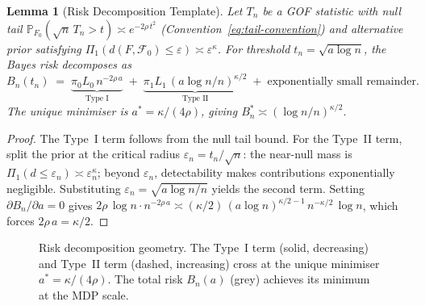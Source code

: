 \documentclass[11pt]{article}
\newcommand{\calF}{\mathcal{F}}
\newcommand{\rhotail}{\rho}  %
\newcommand{\1}{\mathbf{1}}
\newcommand{\PP}{\mathbb{P}}
\theoremstyle{plain}
\newtheorem{lemma}[theorem]{Lemma}
\theoremstyle{definition}
\theoremstyle{remark}
\begin{document}
\begin{lemma}[Risk Decomposition Template]\label{lem:risk-template}
Let $T_n$ be a GOF statistic with null tail $\PP_{F_0}(\sqrt{n}\,T_n > t) \asymp e^{-2\rhotail\, t^2}$ (Convention~\eqref{eq:tail-convention}) and alternative prior satisfying $\Pi_1(d(F,\calF_0)\le\varepsilon)\asymp\varepsilon^{\kappa}$.
For threshold $t_n = \sqrt{a\log n}$, the Bayes risk decomposes as
\[
B_n(t_n) \;=\; \underbrace{\pi_0 L_0\,n^{-2\rhotail\, a}}_{\text{Type I}} \;+\; \underbrace{\pi_1 L_1\,(a\log n/n)^{\kappa/2}}_{\text{Type II}} \;+\; \text{exponentially small remainder}.
\]
The unique minimiser is $a^{*} = \kappa/(4\rhotail)$, giving $B_n^{*} \asymp (\log n/n)^{\kappa/2}$.
\end{lemma}
\begin{proof}
The Type~I term follows from the null tail bound.
For the Type~II term, split the prior at the critical radius $\varepsilon_n = t_n/\sqrt{n}$: the near-null mass is $\Pi_1(d \le \varepsilon_n) \asymp \varepsilon_n^{\kappa}$; beyond $\varepsilon_n$, detectability makes contributions exponentially negligible.
Substituting $\varepsilon_n = \sqrt{a\log n / n}$ yields the second term.
Setting $\partial B_n/\partial a = 0$ gives $2\rhotail\,\log n\cdot n^{-2\rhotail\, a} \asymp (\kappa/2)\,(a\log n)^{\kappa/2-1}\,n^{-\kappa/2}\,\log n$,
which forces $2\rhotail\, a = \kappa/2$.
\end{proof}

\begin{figure}[ht]
\centering
{}
\caption{Risk decomposition geometry.  The Type~I term (solid, decreasing) and Type~II term (dashed, increasing) cross at the unique minimiser $a^{*}=\kappa/(4\rhotail)$.  The total risk $B_n(a)$ (grey) achieves its minimum at the MDP scale.}\label{fig:risk-decomposition}
\end{figure}
\end{document}
